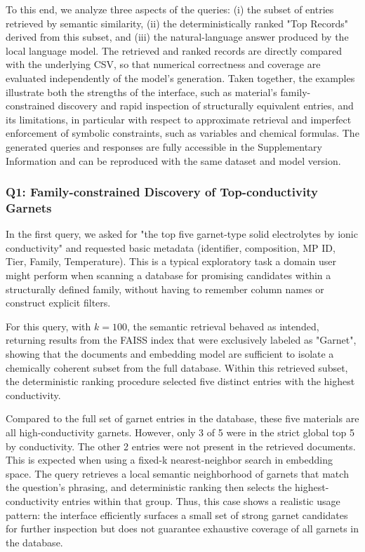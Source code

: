 \documentclass[a4paper,fleqn]{cas-sc}
\begin{document}
To this end, we analyze three aspects of the queries: (i) the subset of entries retrieved by semantic similarity, (ii) the deterministically ranked "Top Records" derived from this subset, and (iii) the natural-language answer produced by the local language model. The retrieved and ranked records are directly compared with the underlying CSV, so that numerical correctness and coverage are evaluated independently of the model's generation. Taken together, the examples illustrate both the strengths of the interface, such as material's family-constrained discovery and rapid inspection of structurally equivalent entries, and its limitations, in particular with respect to approximate retrieval and imperfect enforcement of symbolic constraints, such as variables and chemical formulas. The generated queries and responses are fully accessible in the Supplementary Information and can be reproduced with the same dataset and model version.



\subsubsection{Q1: Family-constrained Discovery of Top-conductivity Garnets} \label{sec:q1}
In the first query, we asked for "the top five garnet-type solid electrolytes by ionic conductivity" and requested basic metadata (identifier, composition, MP ID, Tier, Family, Temperature). This is a typical exploratory task a domain user might perform when scanning a database for promising candidates within a structurally defined family, without having to remember column names or construct explicit filters. 

For this query, with $k = 100$, the semantic retrieval behaved as intended, returning results from the FAISS index that were exclusively labeled as "Garnet", showing that the documents and embedding model are sufficient to isolate a chemically coherent subset from the full database. Within this retrieved subset, the deterministic ranking procedure selected five distinct entries with the highest conductivity. 

Compared to the full set of garnet entries in the database, these five materials are all high-conductivity garnets. However, only 3 of 5 were in the strict global top 5 by conductivity. The other 2 entries were not present in the retrieved documents. This is expected when using a fixed-k nearest-neighbor search in embedding space. The query retrieves a local semantic neighborhood of garnets that match the question's phrasing, and deterministic ranking then selects the highest-conductivity entries within that group. Thus, this case shows a realistic usage pattern: the interface efficiently surfaces a small set of strong garnet candidates for further inspection but does not guarantee exhaustive coverage of all garnets in the database.
\end{document}
